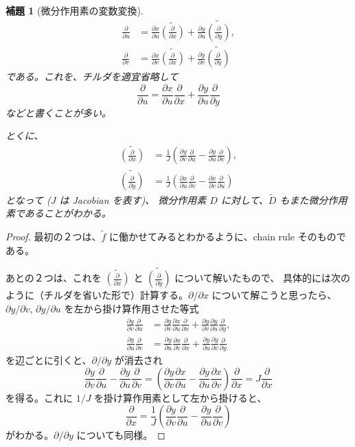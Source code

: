 \documentclass[a4paper]{jsarticle}
\newtheorem{Lemma}[Theorem]{補題}
\theoremstyle{definition}
\theoremstyle{remark}
\newcommand{\del}{\partial}
\begin{document}
\begin{Lemma}[微分作用素の変数変換]
\begin{align*}
\frac{\del}{\del u} &= \frac{\del x}{\del u} 
\widetilde{\left(\frac{\del}{\del x}\right)} 
+ \frac{\del y}{\del u} 
\widetilde{\left(\frac{\del}{\del y}\right)},\\
\frac{\del}{\del v} &= \frac{\del x}{\del v} 
\widetilde{\left(\frac{\del}{\del x}\right)} 
+ \frac{\del y}{\del v} 
\widetilde{\left(\frac{\del}{\del y}\right)}
\end{align*}
である。これを、チルダを適宜省略して
\[
\frac{\del}{\del u} = \frac{\del x}{\del u} {\frac{\del}{\del x}} 
+ \frac{\del y}{\del u} {\frac{\del}{\del y}}
\]
などと書くことが多い。

とくに、
\begin{align*}
\widetilde{\left(\frac{\del}{\del x}\right)} 
&= \frac{1}{J} \left( 
\frac{\del y}{\del v} \frac{\del}{\del u} - 
\frac{\del y}{\del u} \frac{\del}{\del v} \right),\\ 
\widetilde{\left(\frac{\del}{\del y}\right)} 
&= \frac{1}{J} \left( 
\frac{\del x}{\del u} \frac{\del}{\del v} - 
\frac{\del x}{\del v} \frac{\del}{\del u} \right)
\end{align*}
となって {\rm ($J$ は Jacobian を表す)}、
微分作用素 $D$ に対して、$\widetilde D$ もまた微分作用素であることがわかる。
\end{Lemma}

\begin{proof}
  最初の２つは、$\widetilde f$ に働かせてみるとわかるように、chain rule そのものである。

  あとの２つは、これを $\widetilde{\left(\frac{\del}{\del x}\right)}$ と $\widetilde{\left(\frac{\del}{\del y}\right)}$ について解いたもので、
  具体的には次のように（チルダを省いた形で）計算する。$\partial/\partial x$ について解こうと思ったら、$\partial y/\partial v$,
  $\partial y/\partial u$ を左から掛け算作用させた等式
\begin{align*}
\frac{\partial y}{\partial v} \frac{\del}{\del u} &= \frac{\partial y}{\partial v}\frac{\del x}{\del u} \frac{\del}{\del x}
+ \frac{\partial y}{\partial v}\frac{\del y}{\del u} \frac{\del}{\del y},\\
\frac{\partial y}{\partial u} \frac{\del}{\del v} &= \frac{\partial y}{\partial u}\frac{\del x}{\del v} \frac{\del}{\del x}
+ \frac{\partial y}{\partial u}\frac{\del y}{\del v} \frac{\del}{\del y}
\end{align*}
を辺ごとに引くと、$\partial/\partial y$ が消去され
\[
  \frac{\partial y}{\partial v} \frac{\del}{\del u} - \frac{\partial y}{\partial u} \frac{\del}{\del v}
  = \left( \frac{\partial y}{\partial v}\frac{\del x}{\del u} 
    - \frac{\partial y}{\partial u}\frac{\del x}{\del v}\right) \frac{\del}{\del x}
  = J \frac{\del}{\del x}
\]
を得る。これに $1/J$ を掛け算作用素として左から掛けると、
\[
  \frac{\del}{\del x} = \frac{1}{J}
  \left(\frac{\partial y}{\partial v} \frac{\del}{\del u} - \frac{\partial y}{\partial u} \frac{\del}{\del v}\right)
\]
がわかる。$\partial/\partial y$ についても同様。
\end{proof}
\end{document}
